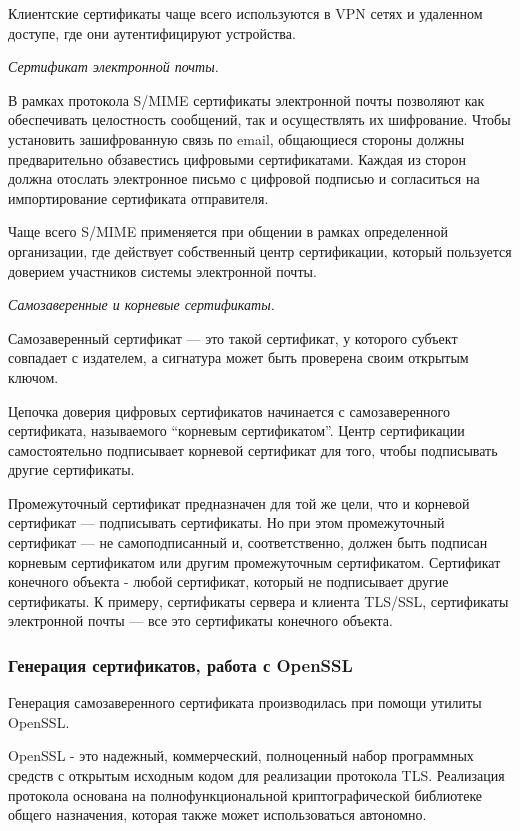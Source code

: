 Клиентские сертификаты чаще всего используются в VPN сетях и удаленном доступе, где они аутентифицируют устройства.

\textit{Сертификат электронной почты.}

В рамках протокола S/MIME сертификаты электронной почты позволяют как обеспечивать целостность сообщений, так и осуществлять их шифрование. Чтобы установить зашифрованную связь по email, общающиеся стороны должны предварительно обзавестись цифровыми сертификатами. Каждая из сторон должна отослать электронное письмо с цифровой подписью и согласиться на импортирование сертификата отправителя.

Чаще всего S/MIME применяется при общении в рамках определенной организации, где действует собственный центр сертификации, который пользуется доверием участников системы электронной почты.

\textit{Самозаверенные и корневые сертификаты.}

Самозаверенный сертификат --- это такой сертификат, у которого субъект совпадает с издателем, а сигнатура может быть проверена своим открытым ключом.

Цепочка доверия цифровых сертификатов начинается с самозаверенного сертификата, называемого ``корневым сертификатом''. Центр сертификации самостоятельно подписывает корневой сертификат для того, чтобы подписывать другие сертификаты.

Промежуточный сертификат предназначен для той же цели, что и корневой сертификат  --- подписывать  сертификаты. Но при этом промежуточный сертификат --- не самоподписанный и,  соответственно, должен быть подписан корневым сертификатом или другим промежуточным сертификатом. Сертификат конечного объекта - любой сертификат, который не подписывает другие сертификаты. К примеру, сертификаты сервера и клиента TLS/SSL, сертификаты электронной почты --- все это сертификаты конечного объекта.

\subsubsection{Генерация сертификатов, работа с OpenSSL}

Генерация самозаверенного сертификата производилась при помощи утилиты OpenSSL.

OpenSSL - это надежный, коммерческий, полноценный набор программных средств с открытым исходным кодом для реализации протокола TLS. Реализация протокола основана на полнофункциональной криптографической библиотеке общего назначения, которая также может использоваться автономно.

